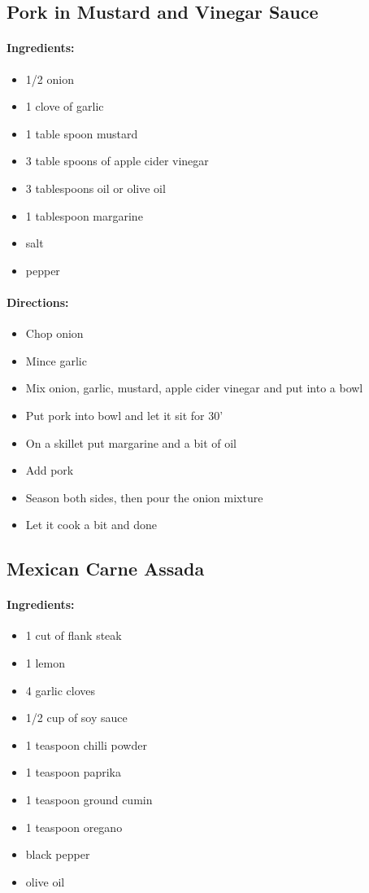 \documentclass{article}
\begin{document}
\subsection{Pork in Mustard and Vinegar Sauce}

\paragraph{Ingredients:}
\begin{itemize}
    \item 1/2 onion
    \item 1 clove of garlic
    \item 1 table spoon mustard
    \item 3 table spoons of apple cider vinegar
    \item 3 tablespoons oil or olive oil
    \item 1 tablespoon margarine
    \item salt
    \item pepper
\end{itemize}

\paragraph{Directions:}
\begin{itemize}
    \item Chop onion
    \item Mince garlic
    \item Mix onion, garlic, mustard, apple cider vinegar and put into a bowl
    \item Put pork into bowl and let it sit for 30'
    \item On a skillet put margarine and a bit of oil
    \item Add pork
    \item Season both sides, then pour the onion mixture
    \item Let it cook a bit and done
\end{itemize}

\subsection{Mexican Carne Assada}

\paragraph{Ingredients:}
\begin{itemize}
    \item 1 cut of flank steak
    \item 1 lemon
    \item 4 garlic cloves
    \item 1/2 cup of soy sauce
    \item 1 teaspoon chilli powder
    \item 1 teaspoon paprika
    \item 1 teaspoon ground cumin
    \item 1 teaspoon oregano
    \item black pepper
    \item olive oil
\end{itemize}
\end{document}
